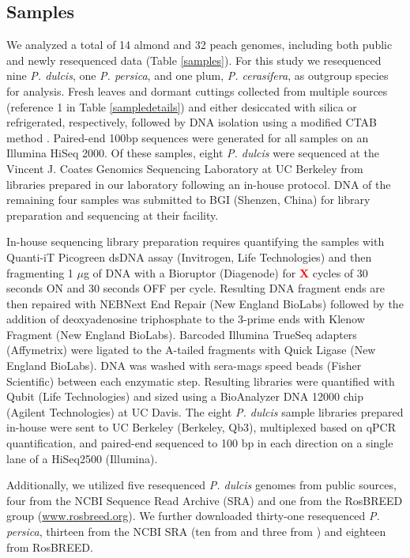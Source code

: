 \documentclass[12pt]{article}
\newcommand{\X}{\textcolor{red}{\bf X }}
\newcommand{\jri}[1]{\textcolor{red}{\emph{#1}}}
\newcommand{\dv}[1]{\textcolor{blue}{\emph{#1}}}
\begin{document}
\subsection*{Samples}
We analyzed a total of 14 almond and 32 peach genomes, including both public and newly resequenced data (Table \ref{samples}). 
%
For this study we resequenced nine \emph{P. dulcis}, one \emph{P. persica}, and one plum, \emph{P. cerasifera}, as outgroup species for analysis.
%
Fresh leaves and dormant cuttings collected from multiple sources (reference 1 in Table \ref{sampledetails}) and either desiccated with silica or refrigerated, respectively, followed by DNA isolation using a modified CTAB method \citep{doyle1987rapid}.
%
Paired-end 100bp sequences were generated for all samples on an Illumina HiSeq 2000. 
%
Of these samples, eight \emph{P. dulcis} were sequenced at the Vincent J. Coates Genomics Sequencing Laboratory at UC Berkeley from libraries prepared in our laboratory following an in-house protocol. 
DNA of the remaining four samples was submitted to BGI (Shenzen, China) for library preparation and sequencing at their facility.

In-house sequencing library preparation requires quantifying the samples with Quanti-iT Picogreen dsDNA assay (Invitrogen, Life Technologies) and then fragmenting 1 $\mu$g of DNA with a Bioruptor (Diagenode) for \X cycles of 30 seconds ON and 30 seconds OFF per cycle. 
%
Resulting DNA fragment ends are then repaired with NEBNext End Repair (New England BioLabs) followed by the addition of deoxyadenosine triphosphate to the 3-prime ends with Klenow Fragment (New England BioLabs). 
%
Barcoded Illumina TrueSeq adapters (Affymetrix) were ligated to the A-tailed fragments with Quick Ligase (New England BioLabs). 
%
DNA was washed with sera-mags speed beads (Fisher Scientific) between each enzymatic step.  
%
Resulting libraries were quantified with Qubit (Life Technologies) and sized using a  BioAnalyzer DNA 12000 chip (Agilent Technologies) at UC Davis. 
%
The eight \emph{P. dulcis} sample libraries prepared in-house were sent to UC Berkeley (Berkeley, Qb3), multiplexed based on qPCR quantification, and paired-end sequenced to 100 bp in each direction on a single lane of a HiSeq2500 (Illumina).

Additionally, we utilized five resequenced \emph{P. dulcis} genomes from public sources, four from \citealt{koepke2013comparative} %
the NCBI Sequence Read Archive (SRA) and one from the RosBREED group (\url{www.rosbreed.org}). 
%
We further downloaded thirty-one resequenced \emph{P. persica}, thirteen from the NCBI SRA (ten from \citealp{verde2013high} and three from \citealp{ahmad2011whole}) and eighteen from RosBREED.
%
%
\end{document}
